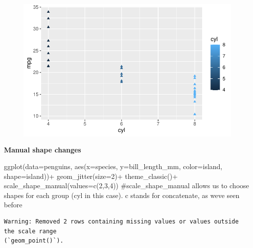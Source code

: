\documentclass[
  letterpaper,
  DIV=11,
  numbers=noendperiod]{scrartcl}
\newenvironment{Shaded}{\begin{snugshade}}{\end{snugshade}}
\newcommand{\AttributeTok}[1]{\textcolor[rgb]{0.40,0.45,0.13}{#1}}
\newcommand{\CommentTok}[1]{\textcolor[rgb]{0.37,0.37,0.37}{#1}}
\newcommand{\DecValTok}[1]{\textcolor[rgb]{0.68,0.00,0.00}{#1}}
\newcommand{\FunctionTok}[1]{\textcolor[rgb]{0.28,0.35,0.67}{#1}}
\newcommand{\NormalTok}[1]{\textcolor[rgb]{0.00,0.23,0.31}{#1}}
\newcommand{\SpecialCharTok}[1]{\textcolor[rgb]{0.37,0.37,0.37}{#1}}
\begin{document}
\begin{figure}[H]

{\centering \includegraphics{Lab_2_files/figure-pdf/unnamed-chunk-29-2.pdf}

}

\end{figure}

\textbf{Manual shape changes}

\begin{Shaded}
\begin{Highlighting}[]
\FunctionTok{ggplot}\NormalTok{(}\AttributeTok{data=}\NormalTok{penguins, }\FunctionTok{aes}\NormalTok{(}\AttributeTok{x=}\NormalTok{species, }\AttributeTok{y=}\NormalTok{bill\_length\_mm, }\AttributeTok{color=}\NormalTok{island, }\AttributeTok{shape=}\NormalTok{island))}\SpecialCharTok{+} 
  \FunctionTok{geom\_jitter}\NormalTok{(}\AttributeTok{size=}\DecValTok{2}\NormalTok{)}\SpecialCharTok{+}
  \FunctionTok{theme\_classic}\NormalTok{()}\SpecialCharTok{+}  
  \FunctionTok{scale\_shape\_manual}\NormalTok{(}\AttributeTok{values=}\FunctionTok{c}\NormalTok{(}\DecValTok{2}\NormalTok{,}\DecValTok{3}\NormalTok{,}\DecValTok{4}\NormalTok{)) }\CommentTok{\#scale\_shape\_manual allows us to choose shapes for each group (cyl in this case). c stands for concatenate, as we\textquotesingle{}ve seen before}
\end{Highlighting}
\end{Shaded}

\begin{verbatim}
Warning: Removed 2 rows containing missing values or values outside the scale range
(`geom_point()`).
\end{verbatim}
\end{document}
